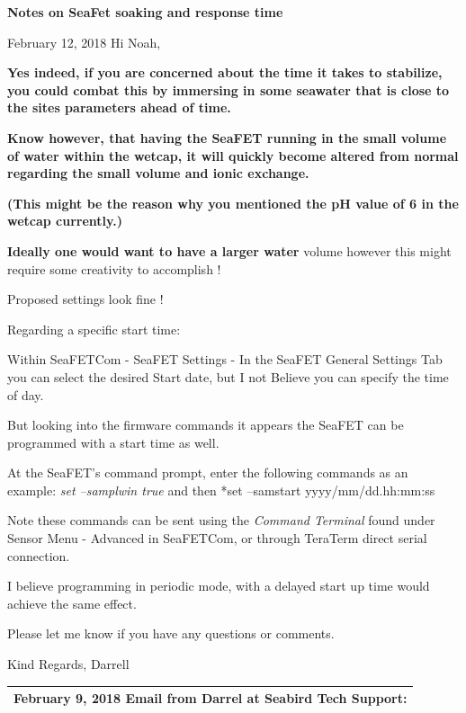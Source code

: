 \documentclass[
]{book}
\begin{document}
\textbf{Notes on SeaFet soaking and response time}

February 12, 2018 Hi Noah,

\textbf{Yes indeed, if you are concerned about the time it takes to stabilize, you could combat this by immersing in some seawater that is close to the sites parameters ahead of time.}

\textbf{Know however, that having the SeaFET running in the small volume of water within the wetcap, it will quickly become altered from normal regarding the small volume and ionic exchange.}

\textbf{(This might be the reason why you mentioned the pH value of 6 in the wetcap currently.)}

\textbf{Ideally one would want to have a larger water} volume however this might require some creativity to accomplish !

Proposed settings look fine !

Regarding a specific start time:

Within SeaFETCom - SeaFET Settings - In the SeaFET General Settings Tab you can select the desired Start date, but I not Believe you can specify the time of day.

But looking into the firmware commands it appears the SeaFET can be programmed with a start time as well.

At the SeaFET's command prompt, enter the following commands as an example: \emph{set --samplwin true} and then *set --samstart yyyy/mm/dd.hh:mm:ss

Note these commands can be sent using the \emph{Command Terminal} found under Sensor Menu - Advanced in SeaFETCom, or through TeraTerm direct serial connection.

I believe programming in periodic mode, with a delayed start up time would achieve the same effect.

Please let me know if you have any questions or comments.

Kind Regards,
Darrell

\begin{longtable}[]{@{}l@{}}
\toprule
February 9, 2018 Email from Darrel at Seabird Tech Support: \\
\midrule
\endhead
\bottomrule
\end{longtable}

\begin{longtable}[]{@{}l@{}}
\toprule
 \\
\midrule
\endhead
\bottomrule
\end{longtable}
\end{document}
